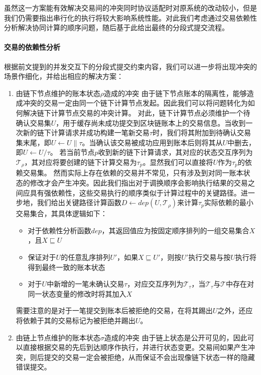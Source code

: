 虽然这一方案能有效解决交易间的冲突同时协议适配时对原系统的改动较小，但是我们仍需要指出串行化的执行将较大影响系统性能。对此我们考虑通过交易依赖性分析解决协同计算的顺序问题，随后基于此给出最终的分段式提交流程。

\paragraph{交易的依赖性分析} 根据前文提到的并发交互下的分段式提交约束内容，我们可以进一步将出现冲突的场景作细化，并给出相应的解决方案：
\begin{enumerate}
    \item 由链下节点维护的账本状态$\rho$造成的冲突
    \subitem 由于链下节点账本的隔离性，能够造成冲突的交易一定由同一个链下计算节点发起。因此我们可以将问题转化为如何解决链下计算节点交易的冲突计算。
    \subitem 对此，链下计算节点必须维护一个待确认交易集$U$，用于缓存尚未成功提交到区块链账本上的交易信息。当收到一次新的链下计算请求并成功构建一笔新交易$\tau$时，我们将其附加到待确认交易集末尾，即$U \leftarrow U\parallel\tau$。当确认该交易被成功应用到账本后则将其从$U$中删去，即$U \leftarrow U / \tau$。
    \subitem 若当前节点$p$收到新的链下计算请求，其对应的状态交互序列为$\mathcal{T}_\rho$，其对应将要创建的链下计算交易为$\tau_p$。显然我们可以直接将$U$作为$\tau_p$的依赖交易集。
    \subitem 然而实际上存在依赖的交易并不常见，只有涉及到对同一账本状态的修改才会产生冲突。因此我们指出对于调换顺序会影响执行结果的交易之间应具有强依赖性，这些交易执行的顺序类似于计算过程中的关键路径。进一步地，我们给出关键路径计算函数$D \leftarrow dep(U, \mathcal{T}_\rho)$来计算$\tau_p$实际依赖的最小交易集合，其具体逻辑如下：
    \begin{itemize}
        \setlength{\itemsep}{0pt}
        \setlength{\parsep}{0pt}
        \setlength{\parskip}{0pt}
            \item 对于依赖性分析函数$dep$，其返回值应为按固定顺序排列的一组交易集合$X$，且$X \sqsubseteq U$
            \item 保证对于$U$的任意乱序排列$U'$，如果$X \sqsubseteq U'$，则按$U'$执行交易与按$U$执行将得到最终一致的账本状态
            \item 对于$U$中新增的一笔未确认交易$\tau$，对应交互序列为$\mathcal{T}_\tau$，当$\mathcal{T}_\tau$与$\mathcal{T}$中存在对同一状态变量的修改时将其加入$X$
    \end{itemize}
    \subitem 需要注意的是对于一笔提交到账本后被拒绝的交易，在将其踢出$U$之外，还应将依赖于其的交易标记为被拒绝并踢出$U$。
    \item 由链上节点维护的账本状态$\sigma$造成的冲突
    \subitem 由于链上状态是公开可见的，因此可以直接根据交易的先后到达顺序作执行，并进行状态变更。交易间如果产生冲突，则后提交的交易一定会被拒绝，从而保证不会出现像链下状态一样的隐藏错误提交。
\end{enumerate}

